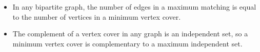 \begin{itemize}
  \item In any bipartite graph, the number of edges in a maximum matching is equal to the number of vertices in a minimum vertex cover.
  \item The complement of a vertex cover in any graph is an independent set, so a minimum vertex cover is complementary to a maximum independent set.
\end{itemize}